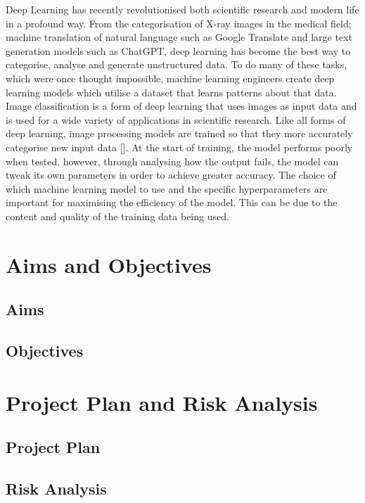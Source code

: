 \documentclass[runningheads]{llncs}
\begin{document}
Deep Learning has recently revolutionised both scientific research and modern
life in a profound way. From the categorisation of X-ray images in the medical
field; machine translation of natural language such as Google Translate and large
text generation models such as ChatGPT, deep learning has become the best way to
categorise, analyse and generate unstructured data. To do many of these tasks, which were
once thought impossible, machine learning engineers create deep learning models
which utilise a dataset that learns patterns about that data. Image
classification is a form of deep learning that uses images as input data and is used for
a wide variety of applications in scientific research. Like all forms of deep learning,
image processing models are trained so that they more accurately categorise new input
data []. At the start of training, the model performs poorly when tested,
however, through analysing how the output fails, the model can tweak its own parameters
in order to achieve greater accuracy. The choice of which machine learning model
to use and the specific hyperparameters are important for maximising the efficiency
of the model. This can be due to the content and quality of the training data being
used.

\section{Aims and Objectives}

\subsection{Aims}

\subsection{Objectives}

\section{Project Plan and Risk Analysis}

\subsection{Project Plan}

\subsection{Risk Analysis}
\end{document}
